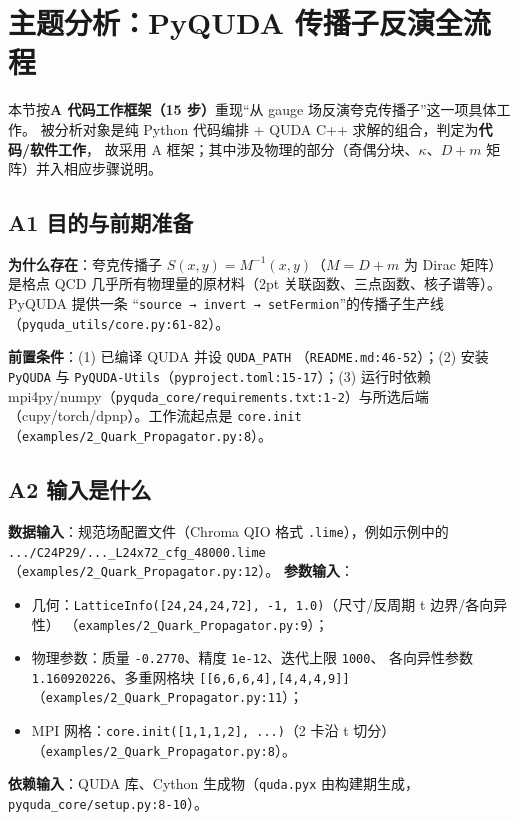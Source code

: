 \documentclass[UTF8]{ctexart}
\begin{document}
\section{主题分析：PyQUDA 传播子反演全流程}

本节按\textbf{A 代码工作框架（15 步）}重现“从 gauge 场反演夸克传播子”这一项具体工作。
被分析对象是纯 Python 代码编排 + QUDA C++ 求解的组合，判定为\textbf{代码/软件工作}，
故采用 A 框架；其中涉及物理的部分（奇偶分块、$\kappa$、$D+m$ 矩阵）并入相应步骤说明。

\subsection{A1 目的与前期准备}
\textbf{为什么存在}：夸克传播子 $S(x,y)=M^{-1}(x,y)$（$M=D+m$ 为 Dirac 矩阵）是格点 QCD
几乎所有物理量的原材料（2pt 关联函数、三点函数、核子谱等）。PyQUDA 提供一条
“\texttt{source → invert → setFermion}”的传播子生产线
（\texttt{\nolinkurl{pyquda_utils/core.py:61-82}}）。

\textbf{前置条件}：(1) 已编译 QUDA 并设 \texttt{QUDA\_PATH}
（\texttt{\nolinkurl{README.md:46-52}}）；(2) 安装 \texttt{PyQUDA} 与
\texttt{PyQUDA-Utils}（\texttt{\nolinkurl{pyproject.toml:15-17}}）；(3) 运行时依赖
mpi4py/numpy（\texttt{\nolinkurl{pyquda_core/requirements.txt:1-2}}）与所选后端
（cupy/torch/dpnp）。工作流起点是 \texttt{core.init}（\texttt{\nolinkurl{examples/2_Quark_Propagator.py:8}}）。

\subsection{A2 输入是什么}
\textbf{数据输入}：规范场配置文件（Chroma QIO 格式 \texttt{.lime}），例如示例中的
\texttt{\nolinkurl{.../C24P29/..._L24x72_cfg_48000.lime}}
（\texttt{\nolinkurl{examples/2_Quark_Propagator.py:12}}）。
\textbf{参数输入}：
\begin{itemize}
  \item 几何：\texttt{LatticeInfo([24,24,24,72], -1, 1.0)}（尺寸/反周期 t 边界/各向异性）
        （\texttt{\nolinkurl{examples/2_Quark_Propagator.py:9}}）；
  \item 物理参数：质量 \texttt{-0.2770}、精度 \texttt{1e-12}、迭代上限 \texttt{1000}、
        各向异性参数 \texttt{1.160920226}、多重网格块 \texttt{[[6,6,6,4],[4,4,4,9]]}
        （\texttt{\nolinkurl{examples/2_Quark_Propagator.py:11}}）；
  \item MPI 网格：\texttt{core.init([1,1,1,2], ...)}（2 卡沿 t 切分）
        （\texttt{\nolinkurl{examples/2_Quark_Propagator.py:8}}）。
\end{itemize}
\textbf{依赖输入}：QUDA 库、Cython 生成物（\texttt{quda.pyx} 由构建期生成，
\texttt{\nolinkurl{pyquda_core/setup.py:8-10}}）。
\end{document}
